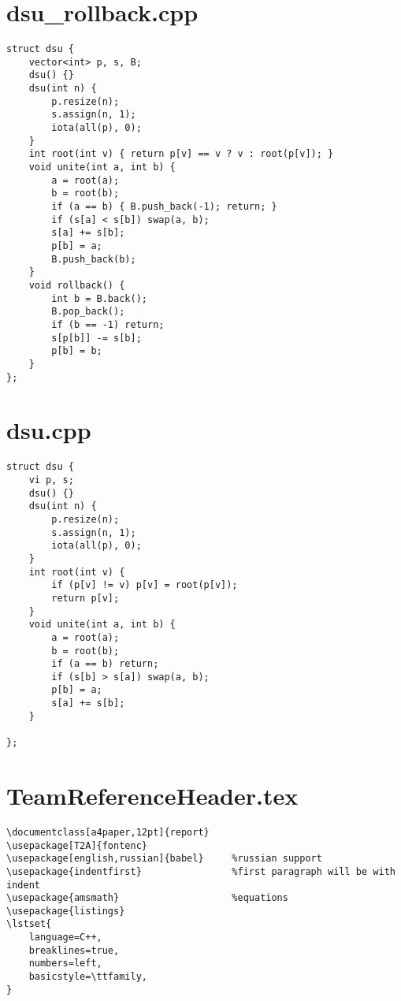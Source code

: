 \documentclass[a4paper,12pt]{report}
\begin{document}
\section{dsu_rollback.cpp}
\begin{lstlisting}
struct dsu {
    vector<int> p, s, B;
    dsu() {}
    dsu(int n) {
        p.resize(n);
        s.assign(n, 1);
        iota(all(p), 0);
    }
    int root(int v) { return p[v] == v ? v : root(p[v]); }
    void unite(int a, int b) {
        a = root(a);
        b = root(b);
        if (a == b) { B.push_back(-1); return; }
        if (s[a] < s[b]) swap(a, b);
        s[a] += s[b];
        p[b] = a;
        B.push_back(b);
    }
    void rollback() {
        int b = B.back();
        B.pop_back();
		if (b == -1) return;
        s[p[b]] -= s[b];
        p[b] = b;
    }
};

\end{lstlisting}


\section{dsu.cpp}
\begin{lstlisting}
struct dsu {
    vi p, s;
    dsu() {}
    dsu(int n) {
        p.resize(n);
        s.assign(n, 1);
        iota(all(p), 0);
    }
    int root(int v) {
        if (p[v] != v) p[v] = root(p[v]);
        return p[v];
    }
    void unite(int a, int b) {
        a = root(a);
        b = root(b);
        if (a == b) return;
        if (s[b] > s[a]) swap(a, b);
        p[b] = a;
        s[a] += s[b];
    }

};

\end{lstlisting}


\section{TeamReferenceHeader.tex}
\begin{lstlisting}
\documentclass[a4paper,12pt]{report}
\usepackage[T2A]{fontenc}
\usepackage[english,russian]{babel}     %russian support
\usepackage{indentfirst}                %first paragraph will be with indent
\usepackage{amsmath}                    %equations
\usepackage{listings}
\lstset{
    language=C++,
    breaklines=true, 
    numbers=left,
    basicstyle=\ttfamily,
} 

\end{lstlisting}
\end{document}
